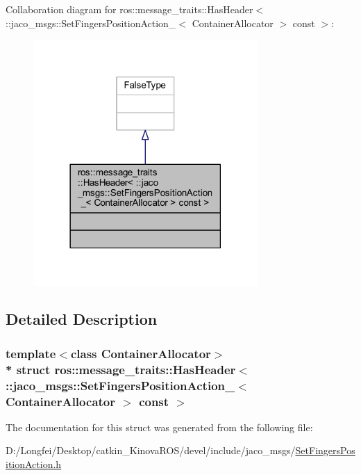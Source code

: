 Collaboration diagram for ros\+:\+:message\+\_\+traits\+:\+:Has\+Header$<$ \+:\+:jaco\+\_\+msgs\+:\+:Set\+Fingers\+Position\+Action\+\_\+$<$ Container\+Allocator $>$ const $>$\+:
\nopagebreak
\begin{figure}[H]
\begin{center}
\leavevmode
\includegraphics[width=242pt]{d8/d53/structros_1_1message__traits_1_1HasHeader_3_01_1_1jaco__msgs_1_1SetFingersPositionAction___3_01C215434d4885c9709982a4a872e58c359}
\end{center}
\end{figure}


\subsection{Detailed Description}
\subsubsection*{template$<$class Container\+Allocator$>$\\*
struct ros\+::message\+\_\+traits\+::\+Has\+Header$<$ \+::jaco\+\_\+msgs\+::\+Set\+Fingers\+Position\+Action\+\_\+$<$ Container\+Allocator $>$ const  $>$}



The documentation for this struct was generated from the following file\+:\begin{DoxyCompactItemize}
\item 
D\+:/\+Longfei/\+Desktop/catkin\+\_\+\+Kinova\+R\+O\+S/devel/include/jaco\+\_\+msgs/\hyperlink{SetFingersPositionAction_8h}{Set\+Fingers\+Position\+Action.\+h}\end{DoxyCompactItemize}
